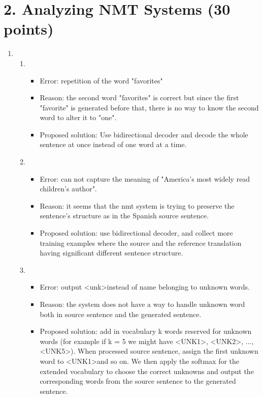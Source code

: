 \documentclass[12pt]{article}
\begin{document}
\section*{2. Analyzing NMT Systems (30 points)}
\begin{enumerate}[label=(\alph*)]
\item
\begin{enumerate}[label=\roman*]
\item
    \begin{itemize}
        \item Error: repetition of the word "favorites"
        \item Reason: the second word "favorites" is correct but since the first "favorite" is generated before that, there is no way to know the second word to alter it to "one".
        \item Proposed solution: Use bidirectional decoder and decode the whole sentence at once instead of one word at a time.
    \end{itemize}
\item
    \begin{itemize}
        \item Error: can not capture the meaning of "America's most widely read children's author".
        \item Reason: it seems that the nmt system is trying to preserve the sentence's structure as in the Spanish source sentence.
        \item Proposed solution: use bidirectional decoder, and collect more training examples where the source and the reference translation having significant different sentence structure.
    \end{itemize}
\item
    \begin{itemize}
        \item Error: output \textless unk\textgreater instead of name belonging to unknown words.
        \item Reason: the system does not have a way to handle unknown word both in source sentence and the generated sentence.
        \item Proposed solution: add in vocabulary k words reserved for unknown words (for example if k = 5 we might have \textless UNK1\textgreater, \textless UNK2\textgreater, ..., \textless UNK5\textgreater). When processed source sentence, assign the first unknown word to \textless UNK1\textgreater and so on. We then apply the softmax for the extended vocabulary to choose the correct unknowns and output the corresponding words from the source sentence to the generated sentence. 

\end{itemize}
\end{enumerate}
\end{enumerate}
\end{document}
